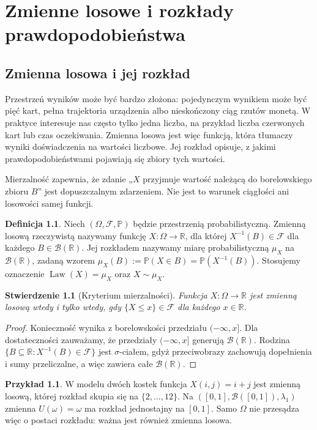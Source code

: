 \documentclass[11pt,a4paper,oneside]{report}
\numberwithin{equation}{chapter}
\theoremstyle{plain}
\newtheorem{stwierdzenie}[twierdzenie]{Stwierdzenie}
\theoremstyle{definition}
\newtheorem{definicja}{Definicja}[chapter]
\newtheorem{przyklad}{Przykład}[chapter]
\theoremstyle{remark}
\newcommand{\R}{\mathbb{R}}
\newcommand{\Prob}{\mathbb{P}}
\newcommand{\Law}{\operatorname{Law}}
\begin{document}
\chapter{Zmienne losowe i rozkłady prawdopodobieństwa}

\section{Zmienna losowa i jej rozkład}
Przestrzeń wyników może być bardzo złożona: pojedynczym wynikiem
może być pięć kart, pełna trajektoria urządzenia albo nieskończony
ciąg rzutów monetą. W praktyce interesuje nas często tylko jedna
liczba, na przykład liczba czerwonych kart lub czas oczekiwania.
Zmienna losowa jest więc funkcją, która tłumaczy wyniki doświadczenia
na wartości liczbowe. Jej rozkład opisuje, z jakimi
prawdopodobieństwami pojawiają się zbiory tych wartości.

Mierzalność zapewnia, że zdanie „$X$ przyjmuje wartość należącą
do borelowskiego zbioru $B$” jest dopuszczalnym zdarzeniem.
Nie jest to warunek ciągłości ani losowości samej funkcji.

\begin{definicja}
Niech $(\Omega,\mathcal F,\Prob)$ będzie przestrzenią probabilistyczną.
Zmienną losową rzeczywistą nazywamy funkcję
$X:\Omega\to\R$, dla której $X^{-1}(B)\in\mathcal F$
dla każdego $B\in\mathcal B(\R)$. Jej rozkładem nazywamy miarę
probabilistyczną $\mu_X$ na $\mathcal B(\R)$, zadaną wzorem
$\mu_X(B):=\Prob(X\in B)=\Prob(X^{-1}(B))$.
Stosujemy oznaczenie $\Law(X)=\mu_X$ oraz $X\sim\mu_X$.
\end{definicja}

\begin{stwierdzenie}[Kryterium mierzalności]
Funkcja $X:\Omega\to\R$ jest zmienną losową wtedy i tylko wtedy,
gdy $\{X\leq x\}\in\mathcal F$ dla każdego $x\in\R$.
\end{stwierdzenie}
\begin{proof}
Konieczność wynika z borelowskości przedziału $(-\infty,x]$.
Dla dostateczności zauważamy, że przedziały $(-\infty,x]$ generują
$\mathcal B(\R)$. Rodzina $\{B\subseteq\R:X^{-1}(B)\in\mathcal F\}$
jest $\sigma$-ciałem, gdyż przeciwobrazy zachowują dopełnienia
i sumy przeliczalne, a więc zawiera całe $\mathcal B(\R)$.
\end{proof}

\begin{przyklad}
W modelu dwóch kostek funkcja $X(i,j)=i+j$ jest zmienną losową,
której rozkład skupia się na $\{2,\ldots,12\}$.
Na $([0,1],\mathcal B([0,1]),\lambda_1)$ zmienna $U(\omega)=\omega$
ma rozkład jednostajny na $[0,1]$. Samo $\Omega$ nie przesądza więc
o postaci rozkładu: ważna jest również zmienna losowa.
\end{przyklad}
\end{document}
